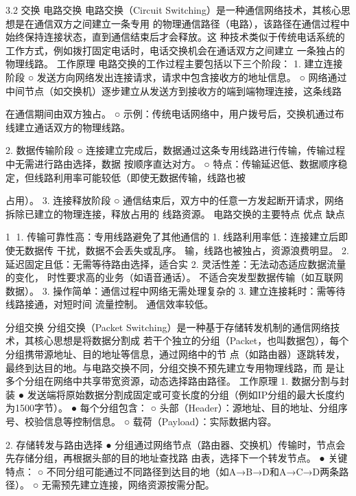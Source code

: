 
3.2 交换
电路交换
电路交换（Circuit Switching）是一种通信网络技术，其核心思想是在通信双方之间建立一条专用
的物理通信路径（电路），该路径在通信过程中始终保持连接状态，直到通信结束后才会释放。这
种技术类似于传统电话系统的工作方式，例如拨打固定电话时，电话交换机会在通话双方之间建立
一条独占的物理线路。
工作原理
电路交换的工作过程主要包括以下三个阶段：
1.   建立连接阶段
     ○ 发送方向网络发出连接请求，请求中包含接收方的地址信息。
     ○ 网络通过中间节点（如交换机）逐步建立从发送方到接收方的端到端物理连接，这条线路

       在通信期间由双方独占。
     ○ 示例：传统电话网络中，用户拨号后，交换机通过布线建立通话双方的物理线路。

2.   数据传输阶段
     ○ 连接建立完成后，数据通过这条专用线路进行传输，传输过程中无需进行路由选择，数据
       按顺序直达对方。
     ○ 特点：传输延迟低、数据顺序稳定，但线路利用率可能较低（即使无数据传输，线路也被

       占用）。
3.   连接释放阶段
     ○   通信结束后，双方中的任意一方发起断开请求，网络拆除已建立的物理连接，释放占用的
         线路资源。
电路交换的主要特点
优点                         缺点




                                                   1
1. 传输可靠性高：专用线路避免了其他通信的     1. 线路利用率低：连接建立后即使无数据传
干扰，数据不会丢失或乱序。              输，线路也被独占，资源浪费明显。
2. 延迟固定且低：无需等待路由选择，适合实     2. 灵活性差：无法动态适应数据流量的变化，
时性要求高的业务（如语音通话）。           不适合突发型数据传输（如互联网数据）。
3. 操作简单：通信过程中网络无需处理复杂的     3. 建立连接耗时：需等待线路接通，对短时间
流量控制。                      通信效率较低。

分组交换
分组交换（Packet Switching）是一种基于存储转发机制的通信网络技术，其核心思想是将数据分割成
若干个独立的分组（Packet，也叫数据包），每个分组携带源地址、目的地址等信息，通过网络中的节
点（如路由器）逐跳转发，最终到达目的地。与电路交换不同，分组交换不预先建立专用物理线路，而
是让多个分组在网络中共享带宽资源，动态选择路由路径。
工作原理
1. 数据分割与封装
   ● 发送端将原始数据分割成固定或可变长度的分组（例如IP分组的最大长度约为1500字节）。
   ● 每个分组包含：
      ○ 头部（Header）：源地址、目的地址、分组序号、校验信息等控制信息。
      ○ 载荷（Payload）：实际数据内容。

2. 存储转发与路由选择
   ● 分组通过网络节点（路由器、交换机）传输时，节点会先存储分组，再根据头部的目的地址查找路
     由表，选择下一个转发节点。
   ● 关键特点：
      ○ 不同分组可能通过不同路径到达目的地（如A→B→D和A→C→D两条路径）。
      ○ 无需预先建立连接，网络资源按需分配。

